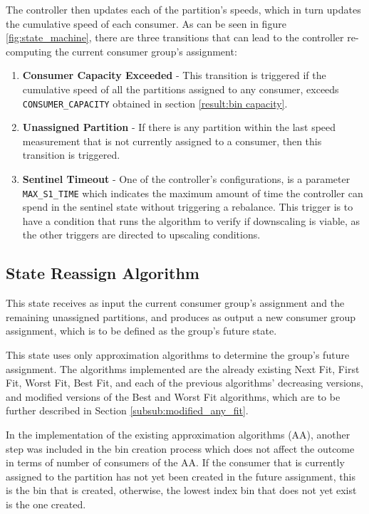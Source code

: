 The controller then updates each of the partition's speeds, which in turn
updates the cumulative speed of each consumer. As can be seen in figure
\ref{fig:state_machine}, there are three transitions that can lead to the
controller re-computing the current consumer group's assignment:
\begin{enumerate} 
    \item \textbf{Consumer Capacity Exceeded} - This transition is triggered if
        the cumulative speed of all the partitions assigned to any consumer,
        exceeds \lstinline{CONSUMER_CAPACITY} obtained in section
        \ref{result:bin capacity}.  
    \item \textbf{Unassigned Partition} - If there is any partition within the
        last speed measurement that is not currently assigned to a consumer,
        then this transition is triggered.  
    \item \textbf{Sentinel Timeout} - One of the controller's configurations, is
        a parameter \lstinline{MAX_S1_TIME} which indicates the
        maximum amount of time the controller can spend in the sentinel state
        without triggering a rebalance. This trigger is to have a condition that
        runs the algorithm to verify if downscaling is viable, as the other
        triggers are directed to upscaling conditions.
\end{enumerate}

\subsection{State Reassign Algorithm}
\label{sub:reassign}

This state receives as input the current consumer group's assignment and the
remaining unassigned partitions, and produces as output a new consumer group
assignment, which is to be defined as the group's future state.

This state uses only approximation algorithms to determine the group's future
assignment. The algorithms implemented are the already existing Next Fit, First
Fit, Worst Fit, Best Fit, and each of the previous algorithms' decreasing
versions, and modified versions of the Best and Worst Fit algorithms, which are
to be further described in Section \ref{subsub:modified_any_fit}. 

In the implementation of the existing approximation algorithms (AA), another step was
included in the bin creation process which does not affect the outcome in terms
of number of consumers of the AA. If the consumer that is currently assigned to
the partition has not yet been created in the future assignment, this is the bin
that is created, otherwise, the lowest index bin that does not yet exist is the
one created.

